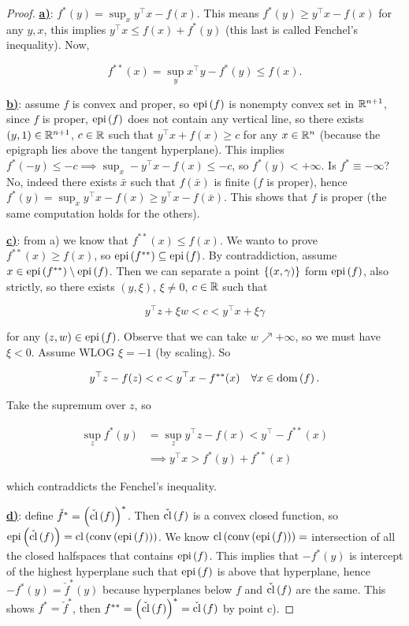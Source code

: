 \begin{proof}
    
    \underline{\textbf{a)}}: $f^*(y) = \sup_x y^\top x - f(x)$. This means $f^*(y) \ge y^\top x - f(x)$ for any $y,x$, this implies $y^\top x \le f(x) + f^*(y)$ (this last is called Fenchel's inequality). Now, 

    \[ f^{**}(x) = \sup_y x^\top y - f^*(y) \le f(x). \]

    \underline{\textbf{b)}}: assume $f$ is convex and proper, so $\mathrm{epi}\left(f\right)$ is nonempty convex set in ${\mathbb{R}^{n+1}}$, since $f$ is proper, $\mathrm{epi}\left(f\right)$ does not contain any vertical line, so there exists $(y,1) \in {\mathbb{R}^{n+1}}$, $c \in \mathbb{R}$ such that $y^\top x + f(x) \ge c$ for any $x \in {\mathbb{R}^n}$ (because the epigraph lies above the tangent hyperplane). This implies $f^*(-y) \le -c \implies \sup_x -y^\top x - f(x) \le -c$, so $f^*(y) < +\infty$. Is $f^* \equiv -\infty$? No, indeed there exists $\bar{x}$ such that $f(\bar{x})$ is finite ($f$ is proper), hence $f^*(y) = \sup_x y^\top x - f(x) \ge y^\top x - f(\bar{x})$. This shows that $f$ is proper (the same computation holds for the others).

    \underline{\textbf{c)}}: from a) we know that $f^{**}(x) \le f(x)$. We wanto to prove $f^{**}(x) \ge f(x)$, so $\mathrm{epi}\left(f^{**}\right) \subseteq \mathrm{epi}\left(f\right)$. By contraddiction, assume $x \in \mathrm{epi}\left(f^{**}\right) \setminus \mathrm{epi}\left(f\right)$. Then we can separate a point $\left\{ (x,\gamma) \right\}$ form $\mathrm{epi}\left(f\right)$, also strictly, so there exists $(y,\xi)$, $\xi \neq 0$, $c \in \mathbb{R}$ such that

    \[ y^\top z + \xi w < c < y^\top x + \xi \gamma \]

    for any $(z,w) \in \mathrm{epi}\left(f\right)$. Observe that we can take $w \nearrow +\infty$, so we must have $\xi < 0$. Assume WLOG $\xi = -1$ (by scaling). So 

    \[ y^\top z - f(z) < c < y^\top x - f^{**}(x) \quad \forall x \in \mathrm{dom}\left(f\right). \]

    Take the supremum over $z$, so 

    \begin{align*}
        \sup_z f^*(y) &= \sup_z y^\top z - f(x) < y^\top - f^{**}(x) \\
            &\implies y^\top x > f^*(y) + f^{**}(x)
    \end{align*}

    which contraddicts the Fenchel's inequality.

    \underline{\textbf{d)}}: define $\check{f}^* = \left(\check{\mathrm{cl}}\left(f\right)\right)^*$. Then $\check{\mathrm{cl}}\left(f\right)$ is a convex closed function, so $\mathrm{epi}\left(\check{\mathrm{cl}}\left(f\right)\right) = \mathrm{cl}\left(\mathrm{conv}\left(\mathrm{epi}\left(f\right)\right)\right)$. We know $\mathrm{cl}\left(\mathrm{conv}\left(\mathrm{epi}\left(f\right)\right)\right) =$ intersection of all the closed halfspaces that contains $\mathrm{epi}\left(f\right)$. This implies that $-f^*(y)$ is intercept of the highest hyperplane such that $\mathrm{epi}\left(f\right)$ is above that hyperplane, hence $-f^*(y) = \check{f}^*(y)$ because hyperplanes below $f$ and $\check{\mathrm{cl}}\left(f\right)$ are the same. This shows $f^* = \check{f}^*$, then $f^{**} = \left(\check{\mathrm{cl}}\left(f\right)\right)^* = \check{\mathrm{cl}}\left(f\right)$ by point c).

\end{proof}

